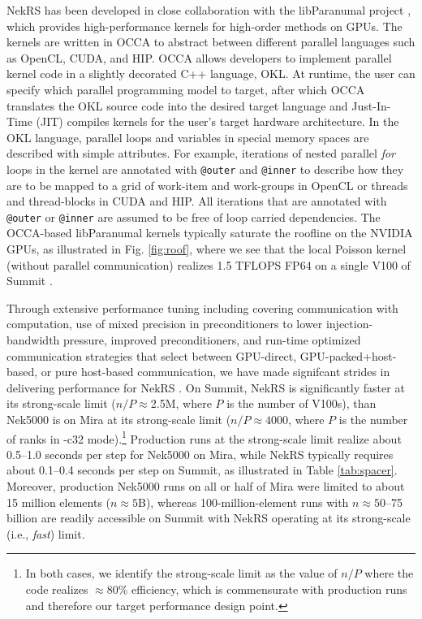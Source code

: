 NekRS has been developed in close collaboration with the libParanumal project
\cite{warburton2019,warburton2019b,ChalmersKarakusAustinSwirydowiczWarburton2020,streamParanumal2020},
which provides high-performance kernels for high-order methods on GPUs.  The
kernels are written in OCCA to abstract between different parallel languages
such as OpenCL, CUDA, and HIP. OCCA allows developers to implement parallel
kernel code in a slightly decorated C++ language, OKL.  At runtime, the user
can specify which parallel programming model to target, after which OCCA
translates the OKL source code into the desired target language and
Just-In-Time (JIT) compiles kernels for the user's target hardware
architecture.  In the OKL language, parallel loops and variables in special
memory spaces are described with simple attributes. For example, iterations of
nested parallel {\em for} loops in the kernel are annotated with
\texttt{@outer} and \texttt{@inner} to describe how they are to be mapped to a
grid of work-item and work-groups in OpenCL or threads and thread-blocks in
CUDA and HIP. All iterations that are annotated with \texttt{@outer} or
\texttt{@inner} are assumed to be free of loop carried dependencies. 
The OCCA-based libParanumal kernels
typically saturate the roofline on the NVIDIA GPUs, as illustrated
in Fig. \ref{fig:roof}, where we see that the local Poisson kernel
(without parallel communication) realizes 1.5 TFLOPS FP64 on a single V100
of Summit \cite{ceed_bp_paper_2020}.

Through extensive performance tuning including covering communication with
computation, use of mixed precision in preconditioners to lower
injection-bandwidth pressure, improved preconditioners, and run-time optimized
communication strategies that select between GPU-direct, GPU-packed+host-based,
or pure host-based communication, we have made signifcant strides in delivering
performance for NekRS \cite{nekrs}.  On Summit, NekRS is significantly faster at
its strong-scale limit ($n/P \approx $2.5M, where $P$ is the number of V100s),
than Nek5000 is on Mira at its strong-scale limit ($n/P \approx 4000$, where $P$
is the number of ranks in -c32 mode).\footnote{In both cases, we identify the
strong-scale limit as the value of $n/P$ where the code realizes $\approx$80\%
efficiency, which is commensurate with production runs and therefore our
target performance design point.}  Production runs at the strong-scale
limit realize about 0.5--1.0 seconds per step for Nek5000 on Mira, while NekRS
typically requires about 0.1--0.4 seconds per step on Summit,  as illustrated
in Table \ref{tab:spacer}.  Moreover, production Nek5000 runs on all or half of
Mira were limited to about 15 million elements ($n \approx 5$B), whereas 100-million-element
runs with $n \approx 50$--75 billion are readily accessible on Summit with NekRS
operating at its strong-scale (i.e., {\em fast}) limit.



